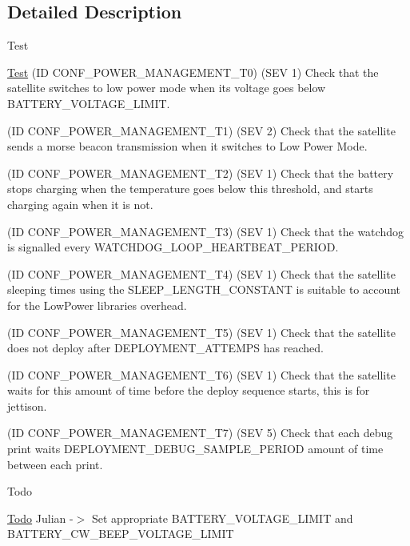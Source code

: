 \subsection{Detailed Description}
\begin{DoxyRefDesc}{Test}
\item[\hyperlink{test__test000017}{Test}](ID C\+O\+N\+F\+\_\+\+P\+O\+W\+E\+R\+\_\+\+M\+A\+N\+A\+G\+E\+M\+E\+N\+T\+\_\+\+T0) (S\+EV 1) Check that the satellite switches to low power mode when its voltage goes below B\+A\+T\+T\+E\+R\+Y\+\_\+\+V\+O\+L\+T\+A\+G\+E\+\_\+\+L\+I\+M\+IT. 

(ID C\+O\+N\+F\+\_\+\+P\+O\+W\+E\+R\+\_\+\+M\+A\+N\+A\+G\+E\+M\+E\+N\+T\+\_\+\+T1) (S\+EV 2) Check that the satellite sends a morse beacon transmission when it switches to Low Power Mode. 

(ID C\+O\+N\+F\+\_\+\+P\+O\+W\+E\+R\+\_\+\+M\+A\+N\+A\+G\+E\+M\+E\+N\+T\+\_\+\+T2) (S\+EV 1) Check that the battery stops charging when the temperature goes below this threshold, and starts charging again when it is not. 

(ID C\+O\+N\+F\+\_\+\+P\+O\+W\+E\+R\+\_\+\+M\+A\+N\+A\+G\+E\+M\+E\+N\+T\+\_\+\+T3) (S\+EV 1) Check that the watchdog is signalled every W\+A\+T\+C\+H\+D\+O\+G\+\_\+\+L\+O\+O\+P\+\_\+\+H\+E\+A\+R\+T\+B\+E\+A\+T\+\_\+\+P\+E\+R\+I\+OD. 

(ID C\+O\+N\+F\+\_\+\+P\+O\+W\+E\+R\+\_\+\+M\+A\+N\+A\+G\+E\+M\+E\+N\+T\+\_\+\+T4) (S\+EV 1) Check that the satellite sleeping times using the S\+L\+E\+E\+P\+\_\+\+L\+E\+N\+G\+T\+H\+\_\+\+C\+O\+N\+S\+T\+A\+NT is suitable to account for the Low\+Power libraries overhead. 

(ID C\+O\+N\+F\+\_\+\+P\+O\+W\+E\+R\+\_\+\+M\+A\+N\+A\+G\+E\+M\+E\+N\+T\+\_\+\+T5) (S\+EV 1) Check that the satellite does not deploy after D\+E\+P\+L\+O\+Y\+M\+E\+N\+T\+\_\+\+A\+T\+T\+E\+M\+PS has reached. 

(ID C\+O\+N\+F\+\_\+\+P\+O\+W\+E\+R\+\_\+\+M\+A\+N\+A\+G\+E\+M\+E\+N\+T\+\_\+\+T6) (S\+EV 1) Check that the satellite waits for this amount of time before the deploy sequence starts, this is for jettison. 

(ID C\+O\+N\+F\+\_\+\+P\+O\+W\+E\+R\+\_\+\+M\+A\+N\+A\+G\+E\+M\+E\+N\+T\+\_\+\+T7) (S\+EV 5) Check that each debug print waits D\+E\+P\+L\+O\+Y\+M\+E\+N\+T\+\_\+\+D\+E\+B\+U\+G\+\_\+\+S\+A\+M\+P\+L\+E\+\_\+\+P\+E\+R\+I\+OD amount of time between each print.\end{DoxyRefDesc}


\begin{DoxyRefDesc}{Todo}
\item[\hyperlink{todo__todo000001}{Todo}]Julian -\/$>$ Set appropriate B\+A\+T\+T\+E\+R\+Y\+\_\+\+V\+O\+L\+T\+A\+G\+E\+\_\+\+L\+I\+M\+IT and B\+A\+T\+T\+E\+R\+Y\+\_\+\+C\+W\+\_\+\+B\+E\+E\+P\+\_\+\+V\+O\+L\+T\+A\+G\+E\+\_\+\+L\+I\+M\+IT\end{DoxyRefDesc}


